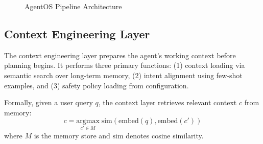 \documentclass{article}
\begin{document}
\begin{figure}[htbp]
\centering
{}
\caption{AgentOS Pipeline Architecture}
\label{fig:architecture}
\end{figure}

\subsection{Context Engineering Layer}

The context engineering layer prepares the agent's working context before planning begins. It performs three primary functions: (1) context loading via semantic search over long-term memory, (2) intent alignment using few-shot examples, and (3) safety policy loading from configuration.

Formally, given a user query $q$, the context layer retrieves relevant context $c$ from memory:
\begin{equation}
c = \underset{c' \in M}{\text{argmax}} \; \text{sim}(\text{embed}(q), \text{embed}(c'))
\end{equation}
where $M$ is the memory store and $\text{sim}$ denotes cosine similarity.
\end{document}
